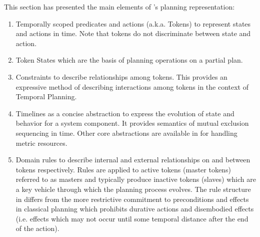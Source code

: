 
This section has presented the main elements of \eu's planning representation:

\begin{enumerate}
    \item Temporally scoped predicates and actions (a.k.a. Tokens) to represent
    states and actions in time. Note that tokens do not discriminate between state and action. 

    \item Token States which are the basis of planning operations on a partial plan.

    \item Constraints to describe relationships among tokens. This provides an
    expressive method of describing interactions among tokens in the context of Temporal Planning.

    \item Timelines as a concise abstraction to express the evolution of state
    and behavior for a system component. It provides semantics of mutual
    exclusion sequencing in time. Other core abstractions are available in
    \eu for handling metric resources.

    \item Domain rules to describe internal and external relationships on and
     between tokens respectively. Rules are applied to active tokens (master tokens) 
     referred to as masters and typically produce inactive
     tokens (slaves) which are a key vehicle through which the planning
     process evolves. The rule structure in \eu differs from the more
     restrictive commitment to preconditions and effects in classical
     planning which prohibits durative actions and disembodied effects
     (i.e. effects which may not occur until some temporal distance after
     the end of the action).
\end{enumerate}

